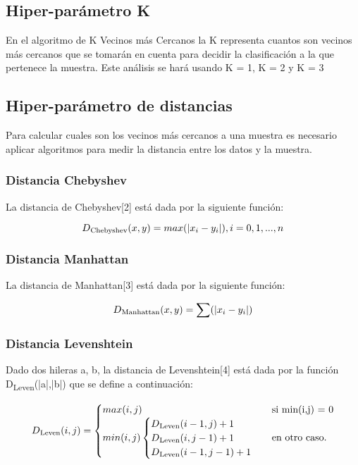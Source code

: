 \documentclass[conference]{IEEEtran}
\begin{document}
\subsection{Hiper-parámetro K}

En el algoritmo de K Vecinos más Cercanos la K representa cuantos son vecinos más cercanos que se tomarán en cuenta para decidir la clasificación a la que pertenece la muestra. Este análisis se hará usando K = 1, K = 2 y K = 3

\subsection{Hiper-parámetro de distancias}

Para calcular cuales son los vecinos más cercanos a una muestra es necesario aplicar algoritmos para medir la distancia entre los datos y la muestra.

\subsubsection{Distancia Chebyshev}

La distancia de Chebyshev[2] está dada por la siguiente función:

\[ D\textsubscript{Chebyshev}(x,y) = max(|x_i-y_i|) , i=0,1,...,n \]

\subsubsection{Distancia Manhattan}

La distancia de Manhattan[3] está dada por la siguiente función:

\[ D\textsubscript{Manhattan}(x,y) = \sum(|x_i-y_i|) \]

\subsubsection{Distancia Levenshtein}

Dado dos hileras a, b, la distancia de Levenshtein[4] está dada por la función D\textsubscript{Leven}(|a|,|b|) que se define a continuación:

\[ D\textsubscript{Leven}(i,j) = 
	\begin{cases}
        max(i,j) & \textrm{si min(i,j) = 0} \\
        min(i,j) 
        \begin{cases}
            D\textsubscript{Leven}(i-1,j)+1\\
            D\textsubscript{Leven}(i,j-1)+1\\
            D\textsubscript{Leven}(i-1,j-1)+1
        \end{cases}
        		& \textrm{en otro caso.}
    \end{cases}	
\]
\end{document}
